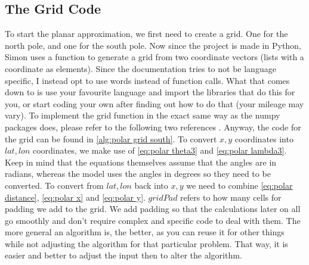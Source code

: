 \subsection{The Grid Code}
To start the planar approximation, we first need to create a grid. One for the north pole, and one for the south pole. Now since the project is made in Python, Simon uses a function to generate 
a grid from two coordinate vectors (lists with a coordinate as elements). Since the documentation tries to not be language specific, I instead opt to use words instead of function calls. What 
that comes down to is use your favourite language and import the libraries that do this for you, or start coding your own after finding out how to do that (your mileage may vary). To implement 
the grid function in the exact same way as the numpy packages does, please refer to the following two references \cite{meshgridDoc} \cite{meshgridGFG}. Anyway, the code for the grid can be found 
in \autoref{alg:polar grid south}. To convert $x, y$ coordinates into $lat, lon$ coordinates, we make use of \autoref{eq:polar theta3} and \autoref{eq:polar lambda3}. Keep in mind that the 
equations themselves assume that the angles are in radians, whereas the model uses the angles in degrees so they need to be converted. To convert from $lat, lon$ back into $x, y$ we need to 
combine \autoref{eq:polar distance}, \autoref{eq:polar x} and \autoref{eq:polar y}. $gridPad$ refers to how many cells for padding we add to the grid. We add padding so that the calculations 
later on all go smoothly and don't require complex and specific code to deal with them. The more general an algorithm is, the better, as you can reuse it for other things while not adjusting
the algorithm for that particular problem. That way, it is easier and better to adjust the input then to alter the algorithm.

